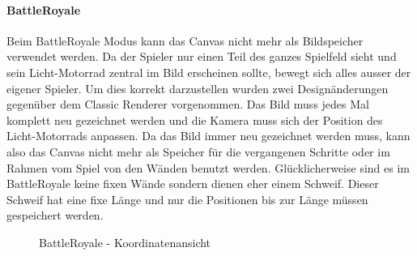 \documentclass[11pt,ngerman]{article}
\begin{document}
    \paragraph{BattleRoyale}
    Beim BattleRoyale Modus kann das \Gls{Canvas} nicht mehr als Bildspeicher verwendet werden. Da der Spieler nur einen Teil des ganzes Spielfeld sieht und sein Licht-Motorrad zentral im Bild erscheinen sollte, bewegt sich alles ausser der eigener Spieler. Um dies korrekt darzustellen wurden zwei Designänderungen gegenüber dem Classic Renderer vorgenommen. Das Bild muss jedes Mal komplett neu gezeichnet werden und die Kamera muss sich der Position des Licht-Motorrads anpassen. Da das Bild immer neu gezeichnet werden muss, kann also das \Gls{Canvas} nicht mehr als Speicher für die vergangenen Schritte oder im Rahmen vom Spiel von den Wänden benutzt werden. Glücklicherweise sind es im BattleRoyale keine fixen Wände sondern dienen eher einem Schweif. Dieser Schweif hat eine fixe Länge und nur die Positionen bis zur Länge müssen gespeichert werden.

    \begin{figure}[H]
    	\centering
    	\caption{BattleRoyale - Koordinatenansicht}
    	\label{fig:BattleRoyale_Coordinates}
    \end{figure}
\end{document}
